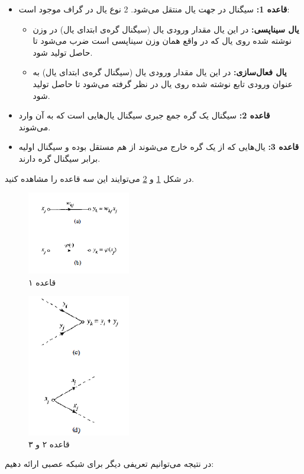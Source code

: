 \documentclass[11pt,a4paper,twocolumn]{article}
\begin{document}
\begin{itemize}
	\item
\textbf{قاعده 1:}
سیگنال در جهت یال منتقل می‌شود. 2 نوع یال در گراف موجود است:
\begin{itemize}
	\item
\textbf{یال سیناپسی:}
در این یال مقدار ورودی یال (سیگنال گره‌ی ابتدای یال) در وزن نوشته شده روی یال که در واقع همان وزن سیناپسی است ضرب می‌شود تا حاصل تولید شود.
\item
\textbf{یال فعال‌سازی:}
در این یال مقدار ورودی یال (سیگنال گره‌ی ابتدای یال) به عنوان ورودی تابع نوشته شده روی یال در نظر گرفته می‌شود تا حاصل تولید شود.
\end{itemize}
\item
\textbf{قاعده 2:}
سیگنال یک گره جمع جبری سیگنال یال‌هایی است که به آن وارد می‌شوند.
\item
\textbf{قاعده 3:}
یال‌هایی که از یک گره خارج می‌شوند از هم مستقل بوده و سیگنال اولیه برابر سیگنال گره دارند.
\end{itemize}
در شکل
\ref{fig:type-1}
و
\ref{fig:type-2}
می‌توایند این سه قاعده را مشاهده کنید.	
\begin{figure}
  \centering
    \includegraphics[width=0.4\textwidth]{type-1.png}
  \caption{قاعده‌ ۱ \cite{haykin}}
  \label{fig:type-1}
\end{figure}

\begin{figure}
  \centering
    \includegraphics[width=0.4\textwidth]{type-2.png}
  \caption{قاعده ۲ و ۳ \cite{haykin}}
  \label{fig:type-2}
\end{figure}
در نتیجه می‌توانیم تعریفی دیگر\cite[ص-۱۷]{haykin}
 برای شبکه عصبی ارائه دهیم:
\\
\end{document}
